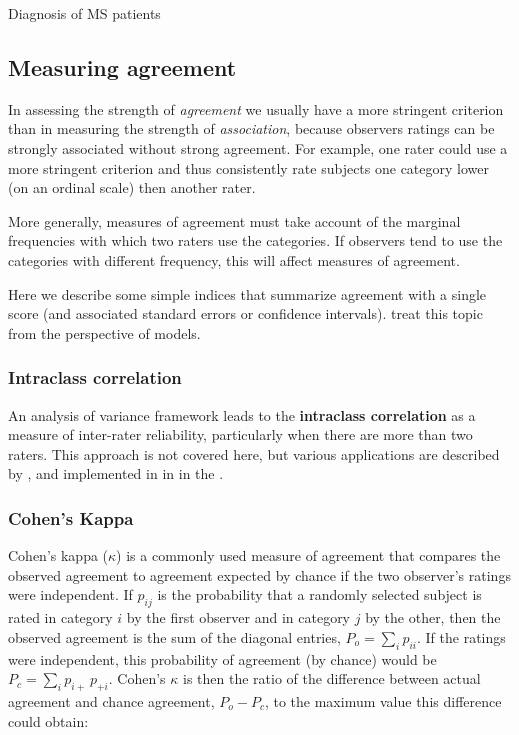 \documentclass[10pt,krantz2]{krantz}\usepackage[]{graphicx}\usepackage[]{color}
\begin{document}
\begin{Example}[MS1]{Diagnosis of MS patients}
%
\end{Example}

\subsection{Measuring agreement}\label{sec:agreemeas}
In assessing the strength of \emph{agreement} we usually have a more
stringent criterion than in measuring the strength of \emph{association},
because observers ratings can be strongly associated without strong agreement.
For example, one rater could use a more stringent criterion and thus consistently rate subjects one category lower (on an ordinal scale) then another rater.

More generally, measures of agreement must take account of the
marginal frequencies with which two raters use the categories.
If observers tend to use the categories
with different frequency, this will affect measures of
agreement.

Here we describe some simple indices that summarize agreement with a
single score (and associated standard errors or confidence intervals).
\citet{vonEyeMun:2006} treat this topic from the perspective of
\loglin models.

\subsubsection{Intraclass correlation}
An analysis of variance framework leads to the {\bf intraclass correlation}
as a measure of inter-rater reliability, particularly when there are
more than two raters.
This approach is not covered here, but various applications are described
by \citet{ShroutFleiss:79}, and implemented in \R in 
in the .

\subsubsection{Cohen's Kappa}

Cohen's kappa (\(\kappa\))
\citep{Cohen:60,Cohen:68} is a commonly used measure of agreement that
compares the observed agreement to agreement expected by chance if the two observer's
ratings were independent.
If $p_{ij}$ is the probability that a randomly selected subject is
rated in category $i$ by the first observer and in category $j$ by
the other, then the observed agreement is the sum of the diagonal
entries,  \(P_o  = \sum_i p_{ii}\).  If the ratings were independent,
this probability of agreement (by chance) would be \(P_c = \sum_i p_{i+} \,  p_{+i}\).
Cohen's $\kappa$ is then the ratio of the difference between actual
agreement and chance agreement, $P_o - P_c$, to the maximum value
this difference could obtain:
\end{document}
